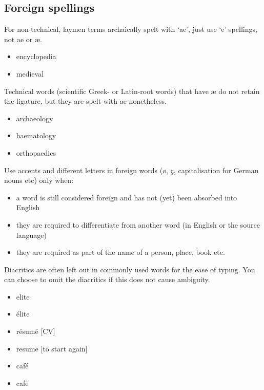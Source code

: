 \documentclass[11pt,a4paper]{book}
\newcommand{\xmark}{{\color{cadmiumred}\ding{54}}}%
\newcommand{\cmark}{{\color{green(html/cssgreen)}\checkmark}}%
\begin{document}
			\subsection{Foreign spellings}
			For non-technical, laymen terms archaically spelt with `ae', just use `e' spellings, not ae or æ.
			{\firasans \begin{mdframed}[backgroundcolor=aliceblue] \begin{itemize}[label=\cmark]
				\item encyclopedia
				\item medieval
			\end{itemize} \end{mdframed} }
			Technical words (scientific Greek- or Latin-root words) that have æ do not retain the ligature, but they are spelt with ae nonetheless. 
				{\firasans \begin{mdframed}[backgroundcolor=aliceblue] \begin{itemize}[label=\cmark]
					\item archaeology
					\item haematology
					\item orthopaedics
				\end{itemize} \end{mdframed} }
			Use accents and different letters in foreign words (ø, ç, capitalisation for German nouns etc) only when:
				\begin{itemize}
					\item a word is still considered foreign and has not (yet) been absorbed into English
					\item they are required to differentiate from another word (in English or the source language)
					\item they are required as part of the name of a person, place, book etc.
				\end{itemize}
				Diacritics are often left out in commonly used words for the ease of typing. You can choose to omit the diacritics if this does not cause ambiguity.
				{\firasans \begin{mdframed}[backgroundcolor=aliceblue] \begin{itemize}[label=\cmark]
					\item elite
					\item[\xmark] élite
					\item résumé [CV]
					\item resume [to start again]
					\item café
					\item cafe
				\end{itemize} \end{mdframed} }
\end{document}
